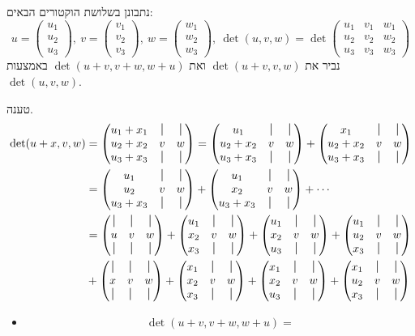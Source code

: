 \documentclass[]{article}
\newcommand\pms[1]    {\begin{pmatrix}
		#1
\end{pmatrix}}
\newcommand*{\vertbar}{\rule[-.5ex]{0.5pt}{2.5ex}}
\begin{document}
	\section{}
	נתבונן בשלושת הוקטורים הבאים: 
	\[ u = \pms{u_1 \\ u_2 \\ u_3}, \ v = \pms{v_1 \\ v_2 \\ v_3}, \ w = \pms{w_1 \\ w_2 \\ w_3}, \ \det(u, v, w) = \det\pms{u_1 & v_1 & w_1 \\ u_2 & v_2 & w_2 \\ u_3 & v_3 & w_3} \]
	נביר את $\det(u + v, v, w)$ ואת $\det(u + v, v + w, w + u)$ באמצעות $\det(u, v, w)$. 
	
	טענה. 
	\begin{align*}{9}
		\det(u + x, v, w) &= \pms{u_1 + x_1 & \vertbar & \vertbar \\ u_2 + x_2 & v & w \\ u_3 + x_3 & \vertbar & \vertbar}
		= \pms{u_1 & \vertbar & \vertbar \\ u_2 + x_2 & v & w \\ u_3 + x_3 & \vertbar & \vertbar} + \pms{x_1 & \vertbar & \vertbar \\ u_2 + x_2 & v & w \\ u_3 + x_3 & \vertbar & \vertbar} \\
		&= \pms{u_1 & \vertbar & \vertbar \\ u_2 & v & w \\ u_3 + x_3 & \vertbar & \vertbar}
		+ \pms{u_1 & \vertbar & \vertbar \\ x_2 & v & w \\ u_3 + x_3 & \vertbar & \vertbar} + \cdots \\
		&= 
		\pms{\vertbar & \vertbar & \vertbar \\ u & v & w \\ \vertbar & \vertbar & \vertbar} 
		+ \pms{u_1 & \vertbar & \vertbar \\ x_2 & v & w \\ x_3 & \vertbar & \vertbar}
		+ \pms{u_1 & \vertbar & \vertbar \\ x_2 & v & w \\ u_3 & \vertbar & \vertbar}
		+ \pms{u_1 & \vertbar & \vertbar \\ u_2 & v & w \\ x_3 & \vertbar & \vertbar} \\
		& + \pms{\vertbar & \vertbar & \vertbar \\ x & v & w \\ \vertbar & \vertbar & \vertbar} 
		+ \pms{x_1 & \vertbar & \vertbar \\ x_2 & v & w \\ x_3 & \vertbar & \vertbar}
		+ \pms{x_1 & \vertbar & \vertbar \\ x_2 & v & w \\ u_3 & \vertbar & \vertbar}
		+ \pms{x_1 & \vertbar & \vertbar \\ u_2 & v & w \\ x_3 & \vertbar & \vertbar}
	\end{align*}
	\begin{itemize}
		\item 
		\[ \det(u + v, v + w, w + u) =  \]
	\end{itemize}
	
\end{document}
